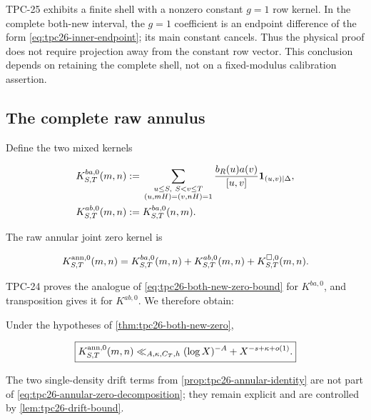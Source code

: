 \begin{remark}
\label{rem:tpc26-principal-mode-cancelled}
TPC-25 exhibits a finite shell with a nonzero constant \(g=1\) row
kernel.  In the complete both-new interval, the \(g=1\) coefficient is
an endpoint difference of the form
\eqref{eq:tpc26-inner-endpoint}; its main constant cancels.  Thus the
physical proof does not require projection away from the constant row
vector.  This conclusion depends on retaining the complete shell, not
on a fixed-modulus calibration assertion.
\end{remark}

\subsection{The complete raw annulus}

Define the two mixed kernels

\begin{align}
 K^{ba,0}_{S,T}(m,n)
 :={}&
 \sum_{\substack{u\le S,\ S<v\le T\\
                  (u,mH)=(v,nH)=1}}
 \frac{b_R(u)a(v)}{[u,v]}
 \mathbf 1_{(u,v)\mid\Delta},
 \label{eq:tpc26-ba-kernel}\\
 K^{ab,0}_{S,T}(m,n)
 :={}&K^{ba,0}_{S,T}(n,m).
 \label{eq:tpc26-ab-kernel}
\end{align}

The raw annular joint zero kernel is

\begin{equation}
 K^{\rm ann,0}_{S,T}(m,n)
 =K^{ba,0}_{S,T}(m,n)+K^{ab,0}_{S,T}(m,n)
 +K^{\square,0}_{S,T}(m,n).
 \label{eq:tpc26-annular-zero-decomposition}
\end{equation}

TPC-24 proves the analogue of
\eqref{eq:tpc26-both-new-zero-bound} for \(K^{ba,0}\), and transposition
gives it for \(K^{ab,0}\).  We therefore obtain:

\begin{corollary}
\label{cor:tpc26-annular-raw-zero}
Under the hypotheses of \cref{thm:tpc26-both-new-zero},

\begin{equation}
 \boxed{
 K^{\rm ann,0}_{S,T}(m,n)
 \ll_{A,\kappa,C_T,h}
 (\log X)^{-A}+X^{-s+\kappa+o(1)}.}
 \label{eq:tpc26-annular-raw-zero-bound}
\end{equation}
\end{corollary}

The two single-density drift terms from
\cref{prop:tpc26-annular-identity} are not part of
\eqref{eq:tpc26-annular-zero-decomposition}; they remain explicit and
are controlled by \cref{lem:tpc26-drift-bound}.
